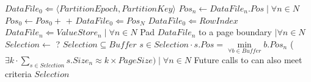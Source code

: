 \documentclass[fleqn]{article}
\begin{document}
\begin{algorithm}
\begin{algorithmic}[1]
   \EndFor
    \State $DataFile_{0} \Leftarrow \langle PartitionEpoch, PartitionKey \rangle$
    \State $Pos_{n} \gets DataFile_{n}.Pos \mid \forall n \in N$
    \State $Pos_{0} \gets Pos_0 + $  $ + $ 
    \State $DataFile_{0} \Leftarrow Pos_{N}$
    \State $DataFile_{0} \Leftarrow RowIndex$
    \State $DataFile_{n} \Leftarrow ValueStore_{n} \mid \forall n \in N$
    \State Pad $DataFile_{n}$ to a page boundary $\mid \forall n \in N$
   \EndFor
\EndProcedure
\Statex
{}
\State $Selection \gets$ ?
\Ensure $Selection \subseteq Buffer$
\Ensure $s \in Selection \cdot s.Pos = \min\limits_{\forall b \in Buffer} b.Pos_{n}$
\Ensure ($\exists k \cdot \sum\limits_{s \in Selection} s.Size_{n} \approx k \times PageSize) \mid \forall n \in N $
\Ensure Future calls to  can also meet criteria
\State \Return $Selection$
\EndFunction
\end{algorithmic}
\end{algorithm}
\end{document}
